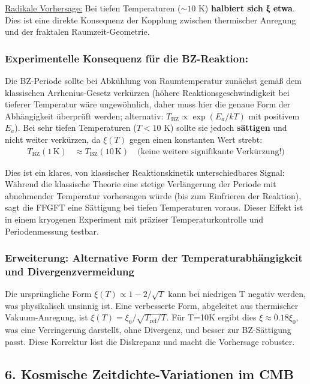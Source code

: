 	\underline{Radikale Vorhersage:} Bei tiefen Temperaturen ($\sim 10$ K) \textbf{halbiert sich ξ etwa}. Dies ist eine direkte Konsequenz der Kopplung zwischen thermischer Anregung und der fraktalen Raumzeit-Geometrie.
	
	\subsubsection*{Experimentelle Konsequenz für die BZ-Reaktion:}
	
	Die BZ-Periode sollte bei Abkühlung von Raumtemperatur zunächst gemäß dem klassischen Arrhenius-Gesetz verkürzen (höhere Reaktionsgeschwindigkeit bei tieferer Temperatur wäre ungewöhnlich, daher muss hier die genaue Form der Abhängigkeit überprüft werden; alternativ: $T_{\text{BZ}} \propto \exp(E_a/kT)$ mit positivem $E_a$). Bei sehr tiefen Temperaturen ($T < 10$ K) sollte sie jedoch \textbf{sättigen} und nicht weiter verkürzen, da $\xi(T)$ gegen einen konstanten Wert strebt:
	\begin{align*}
		T_{\text{BZ}}(1 \, \text{K}) &\approx T_{\text{BZ}}(10 \, \text{K}) \quad \text{(keine weitere signifikante Verkürzung!)}
	\end{align*}
	
	Dies ist ein klares, von klassischer Reaktionskinetik unterschiedbares Signal: Während die klassische Theorie eine stetige Verlängerung der Periode mit abnehmender Temperatur vorhersagen würde (bis zum Einfrieren der Reaktion), sagt die FFGFT eine Sättigung bei tiefen Temperaturen voraus. Dieser Effekt ist in einem kryogenen Experiment mit präziser Temperaturkontrolle und Periodenmessung testbar.
	
	\subsubsection*{Erweiterung: Alternative Form der Temperaturabhängigkeit und Divergenzvermeidung}
	Die ursprüngliche Form $\xi(T) \propto 1 - 2/\sqrt{T}$ kann bei niedrigen T negativ werden, was physikalisch unsinnig ist. Eine verbesserte Form, abgeleitet aus thermischer Vakuum-Anregung, ist $\xi(T) = \xi_0 / \sqrt{T_{\text{ref}}/T}$. Für T=10K ergibt dies $\xi \approx 0.18 \xi_0$, was eine Verringerung darstellt, ohne Divergenz, und besser zur BZ-Sättigung passt. Diese Korrektur löst die Diskrepanz und macht die Vorhersage robuster.
	
	\subsection*{6. Kosmische Zeitdichte-Variationen im CMB}
	
